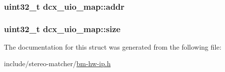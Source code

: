 \subsubsection[{\texorpdfstring{addr}{addr}}]{\setlength{\rightskip}{0pt plus 5cm}uint32\+\_\+t dcx\+\_\+uio\+\_\+map\+::addr}\hypertarget{structdcx__uio__map_a73ce78a039ea5795df6c831b8e011289}{}\label{structdcx__uio__map_a73ce78a039ea5795df6c831b8e011289}
\subsubsection[{\texorpdfstring{size}{size}}]{\setlength{\rightskip}{0pt plus 5cm}uint32\+\_\+t dcx\+\_\+uio\+\_\+map\+::size}\hypertarget{structdcx__uio__map_aa79438031223dcae6e71bebdc58ee8f3}{}\label{structdcx__uio__map_aa79438031223dcae6e71bebdc58ee8f3}


The documentation for this struct was generated from the following file\+:\begin{DoxyCompactItemize}
\item 
include/stereo-\/matcher/\hyperlink{bm-hw-ip_8h}{bm-\/hw-\/ip.\+h}\end{DoxyCompactItemize}
